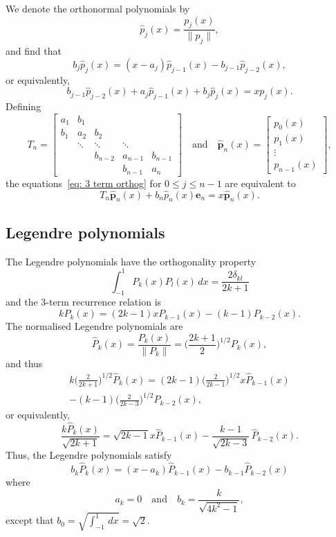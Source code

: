 \documentclass[12pt,a4paper]{article}
\newcommand{\hatvecp}{\hat{\boldsymbol{p}}}
\begin{document}
We denote the orthonormal polynomials by
\[
\hat p_j(x)=\frac{p_j(x)}{\|p_j\|},
\]
and find that
\[
b_j\hat p_j(x)=(x-a_j)\hat p_{j-1}(x)-b_{j-1}\hat p_{j-2}(x),
\]
or equivalently,
\begin{equation}\label{eq: 3 term orthog}
b_{j-1}\hat p_{j-2}(x)+a_j\hat p_{j-1}(x)+b_j\hat p_j(x)=xp_j(x).
\end{equation}
Defining
\[
T_n=\begin{bmatrix}
a_1&b_1   &       &       &\\
b_1&a_2   &b_2    &       &\\
   &\ddots&\ddots &\ddots &\\
   &      &b_{n-2}&a_{n-1}&b_{n-1}\\
   &      &       &b_{n-1}&a_n
\end{bmatrix}
\quad\text{and}\quad
\hatvecp_n(x)=\begin{bmatrix}p_0(x)\\ p_1(x)\\ \vdots\\ p_{n-1}(x)
\end{bmatrix},
\]
the equations~\eqref{eq: 3 term orthog} for $0\le j\le n-1$ are 
equivalent to
\[
T_n\hatvecp_n(x)+b_n\hat p_n(x)\boldsymbol{e}_n=x\hatvecp_n(x).
\]

\subsection{Legendre polynomials}
The Legendre polynomials have the orthogonality property
\begin{equation}\label{eq: legendre orthog}
\int_{-1}^1 P_k(x)P_l(x)\,dx=\frac{2\delta_{kl}}{2k+1}
\end{equation}
and the 3-term recurrence relation is
\begin{equation}\label{eq: legendre 3 term}
kP_k(x)=(2k-1)xP_{k-1}(x)-(k-1)P_{k-2}(x).
\end{equation}
The normalised Legendre polynomials are
\[
\hat P_k(x)=\frac{P_k(x)}{\|P_k\|}=\biggl(\frac{2k+1}{2}\biggr)^{1/2}
	P_k(x),
\]
and thus
\begin{multline*}
k\biggl(\frac{2}{2k+1}\biggr)^{1/2}\hat P_k(x)
	=(2k-1)\biggl(\frac{2}{2k-1}\biggr)^{1/2}x\hat P_{k-1}(x)\\
	-(k-1)\biggl(\frac{2}{2k-3}\biggr)^{1/2}\hat P_{k-2}(x),
\end{multline*}
or equivalently,
\[
\frac{k\hat P_k(x)}{\sqrt{2k+1}}=\sqrt{2k-1}x\hat P_{k-1}(x)
	-\frac{k-1}{\sqrt{2k-3}}\,\hat P_{k-2}(x).
\]
Thus, the Legendre polynomials satisfy
\[
b_k\hat P_k(x)=(x-a_k)\hat P_{k-1}(x)-b_{k-1}\hat P_{k-2}(x)
\]
where
\[
a_k=0\quad\text{and}\quad b_k=\frac{k}{\sqrt{4k^2-1}},
\]
except that $b_0=\sqrt{\int_{-1}^1\,dx}=\sqrt{2}$.
\end{document}
